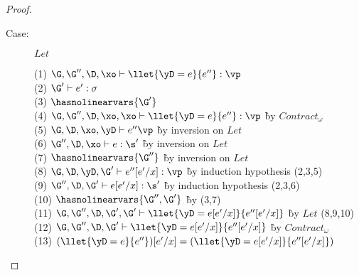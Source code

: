 \begin{proof}
\begin{description}
\item[Case:] $Let$
\begin{tabbing}
    (1) $\G, \G'', \D, \xo \vdash \llet{\yD = e}{e''} : \vp$\\
    (2) $\G' \vdash e' : \sigma$\\
    (3) $\hasnolinearvars{\G'}$\\
    (4) $\G, \G'', \D, \xo, \xo \vdash \llet{\yD = e}{e''} : \vp$ \` by $Contract_\omega$\\
    (5) $\G, \D, \xo ,\yD \vdash e'' \vp$ \` by inversion on $Let$\\
    (6) $\G'', \D, \xo \vdash e : \s'$ \` by inversion on $Let$\\
    (7) $\hasnolinearvars{\G''}$ \` by inversion on $Let$\\
    (8) $\G, \D, \yD, \G' \vdash e''[e'/x] : \vp$ \` by induction hypothesis (2,3,5)\\
    (9) $\G'', \D, \G' \vdash e[e'/x] : \s'$ \` by induction hypothesis (2,3,6)\\
    (10) $\hasnolinearvars{\G'', \G'}$ \` by (3,7)\\
    (11) $\G,\G'',\D,\G',\G' \vdash \llet{\yD = e[e'/x]}{e''[e'/x]}$ \` by $Let$ (8,9,10)\\
    (12) $\G,\G'',\D,\G' \vdash \llet{\yD = e[e'/x]}{e''[e'/x]}$ \` by $Contract_\omega$\\
    (13) $(\llet{\yD = e}{e''})[e'/x] = (\llet{\yD = e[e'/x]}{e''[e'/x]})$
\end{tabbing}


\end{description}
\end{proof}
